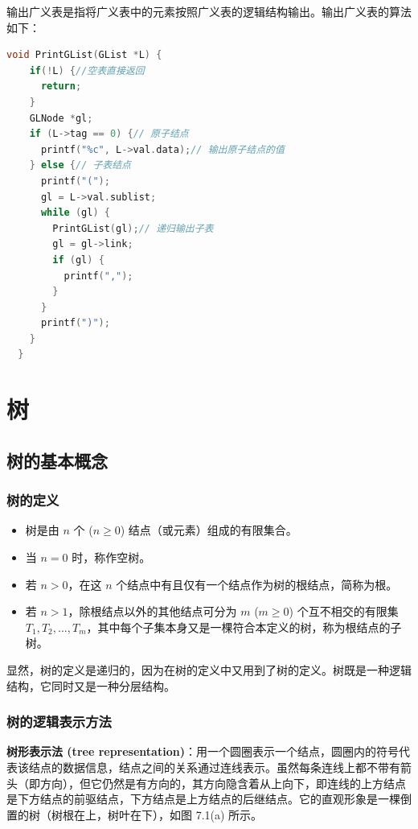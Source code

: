 \documentclass[lang=cn,newtx,10pt,scheme=chinese]{../elegantbook}
\begin{document}
输出广义表是指将广义表中的元素按照广义表的逻辑结构输出。输出广义表的算法如下：

\begin{lstlisting}[language=C++, caption={输出广义表}]
  void PrintGList(GList *L) {
    if(!L) {//空表直接返回
      return;
    }
    GLNode *gl;
    if (L->tag == 0) {// 原子结点
      printf("%c", L->val.data);// 输出原子结点的值
    } else {// 子表结点
      printf("(");
      gl = L->val.sublist;
      while (gl) {
        PrintGList(gl);// 递归输出子表
        gl = gl->link;
        if (gl) {
          printf(",");
        }
      }
      printf(")");
    }
  }
\end{lstlisting}
\chapter{树}

\section{树的基本概念}

\subsection{树的定义}

\begin{itemize}
  \item 树是由 $n$ 个 ($n \geq 0$) 结点（或元素）组成的有限集合。
  \item 当 $n = 0$ 时，称作空树。
  \item 若 $n > 0$，在这 $n$ 个结点中有且仅有一个结点作为树的根结点，简称为根。
  \item 若 $n > 1$，除根结点以外的其他结点可分为 $m$ ($m \geq 0$) 个互不相交的有限集 $T_1, T_2, \dots, T_m$，其中每个子集本身又是一棵符合本定义的树，称为根结点的子树。
\end{itemize}

显然，树的定义是递归的，因为在树的定义中又用到了树的定义。树既是一种逻辑结构，它同时又是一种分层结构。
\subsection{树的逻辑表示方法}

\textbf{树形表示法 (tree representation)}：用一个圆圈表示一个结点，圆圈内的符号代表该结点的数据信息，结点之间的关系通过连线表示。虽然每条连线上都不带有箭头（即方向），但它仍然是有方向的，其方向隐含着从上向下，即连线的上方结点是下方结点的前驱结点，下方结点是上方结点的后继结点。它的直观形象是一棵倒置的树（树根在上，树叶在下），如图 7.1(a) 所示。
\end{document}

